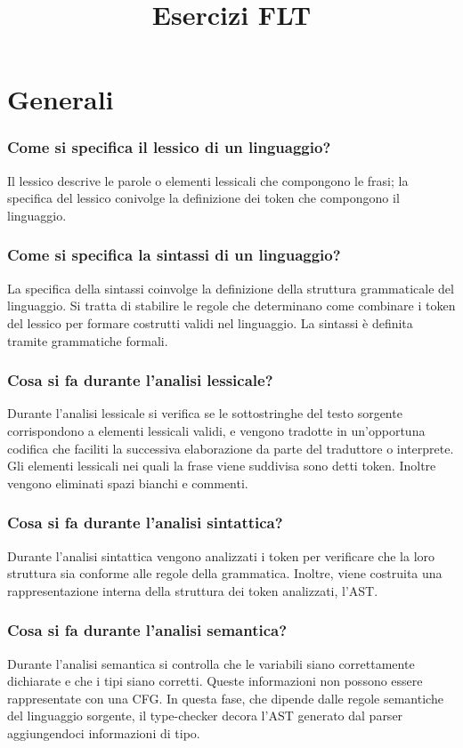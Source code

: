 \documentclass[11pt]{article}
\title{Esercizi FLT}
\begin{document}
\section*{Generali}
\subsubsection*{Come si specifica il lessico di un linguaggio?}
Il lessico descrive le parole o elementi lessicali che compongono le frasi; la specifica del lessico conivolge la definizione 
dei token che compongono il linguaggio.
\subsubsection*{Come si specifica la sintassi di un linguaggio?}
La specifica della sintassi coinvolge la definizione della struttura grammaticale del linguaggio. Si tratta di stabilire 
le regole che determinano come combinare i token del lessico per formare costrutti validi nel linguaggio. La sintassi è 
definita tramite grammatiche formali.
\subsubsection*{Cosa si fa durante l'analisi lessicale?}
Durante l'analisi lessicale si verifica se le sottostringhe del testo sorgente corrispondono a elementi lessicali validi, 
e vengono tradotte in un'opportuna codifica che faciliti la successiva elaborazione da parte del traduttore o interprete.
Gli elementi lessicali nei quali la frase viene suddivisa sono detti token. Inoltre vengono eliminati spazi bianchi e commenti.
\subsubsection*{Cosa si fa durante l'analisi sintattica?}
Durante l'analisi sintattica vengono analizzati i token per verificare che la loro struttura sia conforme alle regole della 
grammatica. Inoltre, viene costruita una rappresentazione interna della struttura dei token analizzati, l'AST.
\subsubsection*{Cosa si fa durante l'analisi semantica?}
Durante l'analisi semantica si controlla che le variabili siano correttamente dichiarate e che i tipi siano corretti. 
Queste informazioni non possono essere rappresentate con una CFG. In questa fase, che dipende dalle regole semantiche del 
linguaggio sorgente, il type-checker decora l'AST generato dal parser aggiungendoci informazioni di tipo.
\end{document}
